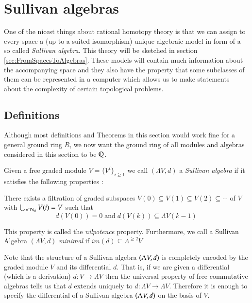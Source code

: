 \section{Sullivan algebras}

One of the nicest things about rational homotopy theory is that we can assign to every space a (up to a
suited isomorphism) unique algebraic model in form of a so called \emph{Sullivan algebra}. This theory
will be sketched in section \ref{sec:FromSpacesToAlgebras}. These models will contain much information
about the accompanying space and they also have the property that some subclasses of them can be
represented in a computer which allows us to make statements about the complexity of certain topological problems.


\subsection{Definitions}
Although most definitions and Theorems in this section would work fine for a general ground ring $R$, we now want the
ground ring of all modules and algebras considered in this section to be $\mathbb{Q}$.

\begin{Definition}
 Given a free graded module $V = {\lbrace {V^i}\rbrace}_{ i \geq 1} $ we call $(\Lambda V, d)$ a \emph{Sullivan algebra} 
 if it satisfies the following properties :
 
  There exists a filtration of graded subspaces $V(0) \subseteq V(1) \subseteq V(2) \subseteq \cdots $ of $V$
  with $\bigcup_{i \in \mathbb{N}_0} V(i) = V$ such that 
  $$ d(V(0)) = 0 \; \text{and} \; d( V(k)) \subseteq  \Lambda V(k-1) $$
  
 This property is called the \emph{nilpotence} property.
 Furthermore, we call a Sullivan Algebra $(\Lambda V,d)$ \emph{minimal} if $im(d) \subseteq \Lambda^{\geq 2} V$
\end{Definition}

Note that the structure of a Sullivan algebra $(\Lambda V,d)$ is completely encoded by the graded module $V$ and its
differential $d$. That is, if we are given a differential (which is a derivation) $d \colon V \to \Lambda V$ then the
universal property of free commutative algebras tells us that $d$ extends uniquely to $d \colon \Lambda V \to \Lambda V$.
Therefore it is enough to specify the differential of a Sullivan algebra $(\Lambda V,d)$ on the basis of $V$.


